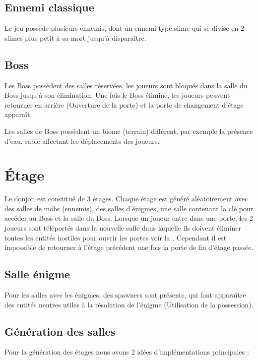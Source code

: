 \subsection*{Ennemi classique}

Le jeu possède plusieurs ennemis, dont un ennemi type slime qui se divise en 2 slimes plus petit à sa mort jusqu'à disparaître.

\subsection*{Boss}

Les Boss possèdent des salles réservées, les joueurs sont bloqués dans la salle du Boss jusqu'à son élimination. Une fois le Boss éliminé, les joueurs peuvent retourner en arrière (Ouverture de la porte) et la porte de changement d'étage apparaît.

Les salles de Boss possèdent un biome (terrain) différent, par exemple la présence d'eau, sable affectant les déplacements des joueurs.

\section{Étage}

Le donjon est constitué de 3 étages. Chaque étage est généré aléatoirement avec des salles de mobs (ennemis), des salles d'énigmes, une salle contenant la clé pour accéder au Boss et la salle du Boss. Lorsque un joueur entre dans une porte, les 2 joueurs sont téléportés dans la nouvelle salle dans laquelle ils doivent éliminer toutes les entités hostiles pour ouvrir les portes voir la . Cependant il est impossible de retourner à l'étage précédent une fois la porte de fin d'étage passée.

\subsection*{Salle énigme}

Pour les salles avec les énigmes, des spawners sont présents, qui font apparaître des entités neutres utiles à la résolution de l'énigme (Utilisation de la possession). 

\subsection*{Génération des salles}

Pour la génération des étages nous avons 2 idées d'implémentations principales :

